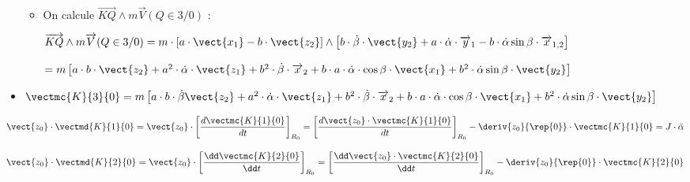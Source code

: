 \begin{multicols}{2}
\begin{corrige}
\begin{itemize}
\begin{itemize}
\item On calcule $\overrightarrow{KQ}\wedge m\overrightarrow{V}(Q\in 3/0)$ : 

$\overrightarrow{KQ}\wedge m\overrightarrow{V}(Q\in 3/0)=m\cdot \left[a\cdot \vect{x_{1}}-b\cdot \vect{z_2}\right]\wedge\left[b\cdot \dot{\beta}\cdot \vect{y_{2}}+a\cdot \dot{\alpha}\cdot \overrightarrow{y}_1-b\cdot\dot{\alpha} \sin\beta\cdot \overrightarrow{x}_{1,2}\right]$

$=m\left[a\cdot b\cdot \vect{z_2}+a^2\cdot \dot{\alpha}\cdot\vect{z_{1}}+b^2\cdot \dot{\beta}\cdot\overrightarrow{x}_2+b\cdot a\cdot \dot{\alpha}\cdot \cos\beta\cdot \vect{x_{1}}+b^2\cdot \dot{\alpha}\sin\beta\cdot \vect{y_{2}}\right]
$
\end{itemize}

\item
$
\vectmc{K}{3}{0}=m\left[a\cdot b\cdot\dot{\beta} \vect{z_2}+a^2\cdot \dot{\alpha}\cdot\vect{z_{1}}+b^2\cdot \dot{\beta}\cdot\overrightarrow{x}_2+b\cdot a\cdot \dot{\alpha}\cdot \cos\beta\cdot \vect{x_{1}}+b^2\cdot \dot{\alpha}\sin\beta\cdot \vect{y_{2}}\right]
$

\end{itemize}

\end{corrige}
\else
\fi



\ifprof
\begin{corrige}
\begin{align*}
\vect{z_0}\cdot \vectmd{K}{1}{0}=\vect{z_0}\cdot\left[\frac{d\vectmc{K}{1}{0}}{dt}\right]_{R_0}
=\left[\frac{d\vect{z_0}\cdot\vectmc{K}{1}{0}}{dt}\right]_{R_0}- \deriv{z_0}{\rep{0}}\cdot \vectmc{K}{1}{0}=J\cdot \ddot{\alpha}
\end{align*}
\end{corrige}
\else
\fi



\ifprof
\begin{corrige}
\begin{align*}
\vect{z_0}\cdot \vectmd{K}{2}{0}=\vect{z_0}\cdot\left[\frac{\dd\vectmc{K}{2}{0}}{\dd t}\right]_{R_0}
=\left[\frac{\dd \vect{z_0}\cdot\vectmc{K}{2}{0}}{\dd t}\right]_{R_0}- \deriv{z_0}{\rep{0}}\cdot \vectmc{K}{2}{0}
\end{align*}


\end{corrige}
\end{multicols}
